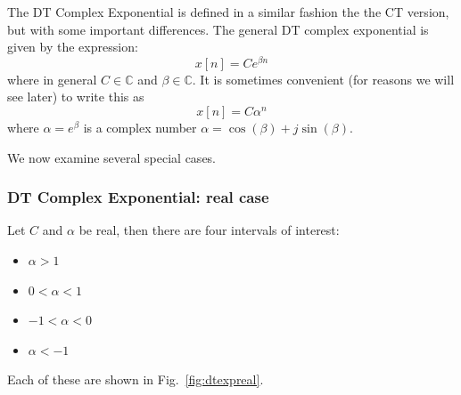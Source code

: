 The DT Complex Exponential is defined in a similar fashion the the CT version, but with some important differences. The general DT complex exponential is given by the expression:
\[
x[n] = Ce^{\beta n}
\]
where in general $C \in \mathbb{C}$ and $\beta \in \mathbb{C}$. It is sometimes convenient (for reasons we will see later) to write this as
\[
x[n] = C \alpha^n
\]
where $\alpha = e^{\beta}$ is a complex number $\alpha = \cos(\beta) + j\sin(\beta)$.

We now examine several special cases.

\subsubsection{DT Complex Exponential: real case}

Let $C$ and $\alpha$ be real, then there are four intervals of interest:

\begin{itemize}
\item $\alpha > 1$
\item $ 0 < \alpha < 1$
\item $-1 < \alpha < 0$
\item $\alpha < -1$
\end{itemize}

Each of these are shown in Fig.~\ref{fig:dtexpreal}.

